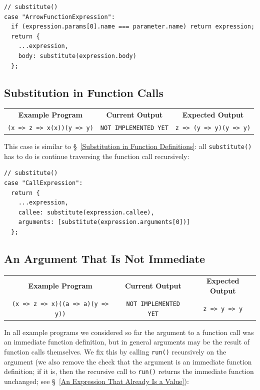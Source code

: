 \documentclass[12pt, oneside]{book}
\begin{document}
\begin{verbatim}
// substitute()
case "ArrowFunctionExpression":
  if (expression.params[0].name === parameter.name) return expression;
  return {
    ...expression,
    body: substitute(expression.body)
  };
\end{verbatim}

\subsection{Substitution in Function Calls}
\label{Substitution in Function Calls}

\begin{center}
\begin{tabular}{c|c|c}
\textbf{Example Program} & \textbf{Current Output} & \textbf{Expected Output} \\
\texttt{(x => z => x(x))(y => y)} & \texttt{NOT IMPLEMENTED YET} & \texttt{z => (y => y)(y => y)} \\
\end{tabular}
\end{center}

This case is similar to §~\ref{Substitution in Function Definitions}: all \texttt{substitute()} has to do is continue traversing the function call recursively:

\begin{verbatim}
// substitute()
case "CallExpression":
  return {
    ...expression,
    callee: substitute(expression.callee),
    arguments: [substitute(expression.arguments[0])]
  };
\end{verbatim}

\subsection{An Argument That Is Not Immediate}
\label{An Argument That Is Not Immediate}

\begin{center}
\begin{tabular}{c|c|c}
\textbf{Example Program} & \textbf{Current Output} & \textbf{Expected Output} \\
\texttt{(x => z => x)((a => a)(y => y))} & \texttt{NOT IMPLEMENTED YET} & \texttt{z => y => y} \\
\end{tabular}
\end{center}

In all example programs we considered so far the argument to a function call was an immediate function definition, but in general arguments may be the result of function calls themselves. We fix this by calling \texttt{run()} recursively on the argument (we also remove the check that the argument is an immediate function definition; if it is, then the recursive call to \texttt{run()} returns the immediate function unchanged; see §~\ref{An Expression That Already Is a Value}):
\end{document}
